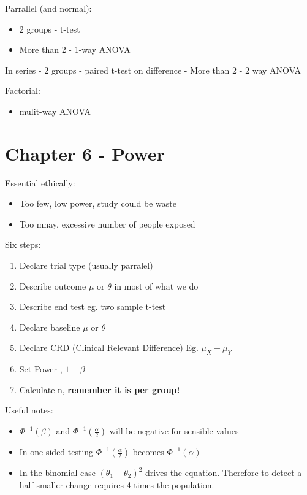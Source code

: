 \documentclass[
  letterpaper,
  DIV=11,
  numbers=noendperiod]{scrreprt}
\providecommand{\tightlist}{%
  \setlength{\itemsep}{0pt}\setlength{\parskip}{0pt}}\usepackage{longtable,booktabs,array}
\begin{document}
Parrallel (and normal):

\begin{itemize}
\tightlist
\item
  2 groups - t-test
\item
  More than 2 - 1-way ANOVA
\end{itemize}

In series - 2 groups - paired t-test on difference - More than 2 - 2 way
ANOVA

Factorial:

\begin{itemize}
\tightlist
\item
  mulit-way ANOVA
\end{itemize}

\hypertarget{chapter-6---power}{%
\section{Chapter 6 - Power}\label{chapter-6---power}}

Essential ethically:

\begin{itemize}
\tightlist
\item
  Too few, low power, study could be waste
\item
  Too mnay, excessive number of people exposed
\end{itemize}

Six steps:

\begin{enumerate}
\def\labelenumi{\arabic{enumi})}
\tightlist
\item
  Declare trial type (usually parralel)
\item
  Describe outcome \(\mu\) or \(\theta\) in most of what we do
\item
  Describe end test eg. two sample t-test
\item
  Declare baseline \(\mu\) or \(\theta\)
\item
  Declare CRD (Clinical Relevant Difference) Eg. \(\mu_X - \mu_Y\)
\item
  Set Power , \(1- \beta\)
\item
  Calculate n, \textbf{remember it is per group!}
\end{enumerate}

Useful notes:

\begin{itemize}
\tightlist
\item
  \(\Phi^{-1}(\beta)\) and \(\Phi^{-1}(\frac{\alpha}{2})\) will be
  negative for sensible values
\item
  In one sided testing \(\Phi^{-1}(\frac{\alpha}{2})\) becomes
  \(\Phi^{-1}(\alpha)\)
\item
  In the binomial case \((\theta_1 - \theta_2)^2\) drives the equation.
  Therefore to detect a half smaller change requires 4 times the
  population.
\end{itemize}
\end{document}
